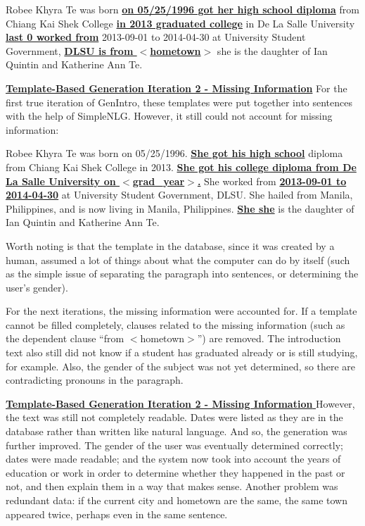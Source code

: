 \begin{center} Robee Khyra Te was born \underline{\textbf{on 05/25/1996 got her high school diploma}} from Chiang Kai Shek College \underline{\textbf{in 2013 graduated college}}  in De La Salle University \underline{\textbf{last 0 worked from}} 2013-09-01 to 2014-04-30 at University Student Government, \underline{\textbf{DLSU is from $<$hometown$>$}} she is the daughter of Ian Quintin and Katherine Ann Te.
 \end{center}

\underline{\textbf{Template-Based Generation Iteration 2 - Missing Information}} \newline
For the first true iteration of GenIntro, these templates were put together into sentences with the help of SimpleNLG. However, it still could not account for missing information:

\begin{center} Robee Khyra Te was born on 05/25/1996. \underline{\textbf{She got his high school}} diploma from Chiang Kai Shek College in 2013. \underline{\textbf{She got his college diploma from De La Salle University on $<$grad\_year$>$.}} She worked from \underline{\textbf{2013-09-01 to 2014-04-30}} at University Student Government, DLSU. She hailed from Manila, Philippines, and is now living in Manila, Philippines. \underline{\textbf{She she}} is the daughter of Ian Quintin and Katherine Ann Te.
 \end{center}

Worth noting is that the template in the database, since it was created by a human, assumed a lot of things about what the computer can do by itself (such as the simple issue of separating the paragraph into sentences, or determining the user's gender). 

For the next iterations, the missing information were accounted for. If a template cannot be filled completely, clauses related to the missing information (such as the dependent clause ``from $<$hometown$>$”) are removed. The introduction text also still did not know if a student has graduated already or is still studying, for example. Also, the gender of the subject was not yet determined, so there are contradicting pronouns in the paragraph.

\underline{\textbf{\underline{\textbf{Template-Based Generation Iteration 2 - Missing Information}} \newline}} \newline
However, the text was still not completely readable. Dates were listed as they are in the database rather than written like natural language. And so, the generation was further improved. The gender of the user was eventually determined correctly; dates were made readable; and the system now took into account the years of education or work in order to determine whether they happened in the past or not, and then explain them in a way that makes sense. Another problem was redundant data: if the current city and hometown are the same, the same town appeared twice, perhaps even in the same sentence.

